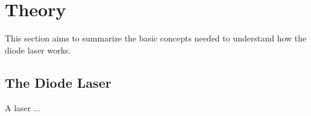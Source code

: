 \section{Theory}
\label{sec:theory}
This section aims to summarize the basic concepts needed to understand how the
diode laser works.
\subsection{The Diode Laser}
\label{sec:diodelaser}
A laser ...
